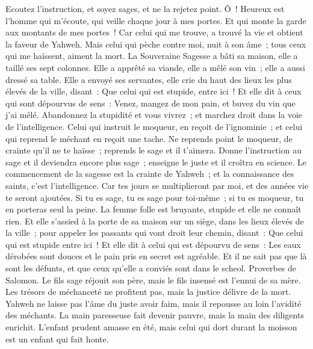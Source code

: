\begin{multicols}{2}
Ecoutez l'instruction, et soyez sages, et ne la rejetez point.
Ô~! Heureux est l'homme qui m'écoute, qui veille chaque jour à mes portes. Et qui monte la garde aux montants de mes portes~!
Car celui qui me trouve, a trouvé la vie et obtient la faveur de Yahweh.
Mais celui qui pèche contre moi, nuit à son âme~; tous ceux qui me haïssent, aiment la mort.
\VerseOne{}La Souveraine Sagesse a bâti sa maison, elle a taillé ses sept colonnes.
Elle a apprêté sa viande, elle a mêlé son vin~; elle a aussi dressé sa table.
Elle a envoyé ses servantes, elle crie du haut des lieux les plus élevés de la ville, disant~: 
Que celui qui est stupide, entre ici~! Et elle dit à ceux qui sont dépourvus de sens~:
Venez, mangez de mon pain, et buvez du vin que j'ai mêlé.
Abandonnez la stupidité et vous vivrez~; et marchez droit dans la voie de l'intelligence.
Celui qui instruit le moqueur, en reçoit de l'ignominie~; et celui qui reprend le méchant en reçoit une tache.
Ne reprends point le moqueur, de crainte qu'il ne te haïsse~; reprends le sage et il t'aimera.
Donne l'instruction au sage et il deviendra encore plus sage~; enseigne le juste et il croîtra en science.
Le commencement de la sagesse est la crainte de Yahweh~; et la connaissance des saints, c'est l'intelligence.
Car tes jours se multiplieront par moi, et des années vie te seront ajoutées.
Si tu es sage, tu es sage pour toi-même~; si tu es moqueur, tu en porteras seul la peine.
La femme folle est bruyante, stupide et elle ne connaît rien.
Et elle s'assied à la porte de sa maison sur un siège, dans les lieux élevés de la ville~;
pour appeler les passants qui vont droit leur chemin, disant~:
Que celui qui est stupide entre ici~! Et elle dit à celui qui est dépourvu de sens~:
Les eaux dérobées sont douces et le pain pris en secret est agréable.
Et il ne sait pas que là sont les défunts, et que ceux qu'elle a conviés sont dans le scheol.
\VerseOne{}Proverbes de Salomon. Le fils sage réjouit son père, mais le fils insensé est l'ennui de sa mère.
Les trésors de méchanceté ne profitent pas, mais la justice délivre de la mort.
Yahweh ne laisse pas l'âme du juste avoir faim, mais il repousse au loin l'avidité des méchants.
La main paresseuse fait devenir pauvre, mais la main des diligents enrichit.
L'enfant prudent amasse en été, mais celui qui dort durant la moisson est un enfant qui fait honte.

\end{multicols}
